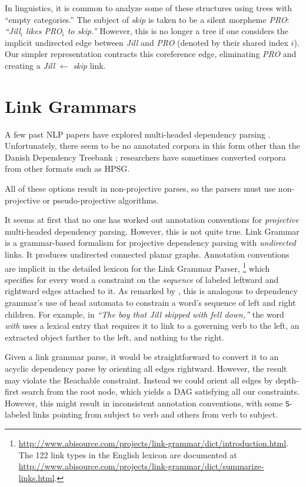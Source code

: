 \documentclass[11pt]{article}
\newcommand{\Note}[4][]{\todo[author=#2,color=#3,fancyline,#1]{#4}}
\newcommand{\noteJE}[2][]{\Note[#1]{JE}{green!40}{#2}}
\begin{document}
In linguistics, it is common to analyze some of these structures using trees with ``empty categories.''  The subject of {\em skip} is taken to be a silent morpheme {\em PRO}:
{\em ``Jill$_i$ likes PRO$_i$ to skip.''}  However, this is no longer a tree if one considers the implicit undirected edge between {\em Jill} and {\em PRO} (denoted by their shared index $i$).  Our simpler representation contracts this coreference edge, eliminating {\em PRO} and creating a {\em Jill} $\leftarrow$ {\em skip} link.  

\section{Link Grammars}

A few past NLP papers have explored multi-headed dependency parsing \cite{buchkromann-2006,mcdonald-pereira-2006,sagae-tsujii-2008,gomezrodriguez-nivre-2013}.  Unfortunately, there seem to be no annotated corpora in this form other than the Danish Dependency Treebank \cite{kromann-2003}; researchers have sometimes converted corpora from other formats such as HPSG.  

All of these options result in non-projective parses, so the parsers must use non-projective or pseudo-projective algorithms.

It seems at first that no one has worked out annotation conventions for {\em projective} multi-headed dependency parsing.  However, this is not quite true.  Link Grammar \cite{SleatorTemperly91} is a grammar-based formalism for projective dependency parsing with {\em undirected} links.  It produces undirected connected planar graphs.  Annotation conventions are implicit in the detailed lexicon for the Link Grammar Parser,\noteJE{check caps}%
\footnote{\url{http://www.abisource.com/projects/link-grammar/dict/introduction.html}.  The 122 link types in the English lexicon are documented at \url{http://www.abisource.com/projects/link-grammar/dict/summarize-links.html}.} 
which specifies for every word a constraint on the {\em sequence} of labeled leftward and rightward edges attached to it.  As remarked by , this is analogous to dependency grammar's use of head automata to constrain a word's sequence of left and right children.  For example, in {\em ``The boy that Jill skipped with fell down,''} the word {\em with} uses a lexical entry that requires it to link to a governing verb to the left, an extracted object farther to the left, and nothing to the right.

Given a link grammar parse, it would be straightforward to convert it to an acyclic dependency parse by orienting all edges rightward.  However, the result may violate the {\sc Reachable} constraint.  Instead we could orient all edges by depth-first search from the root node, which yields a DAG satisfying all our constraints.  However, this might result in inconsistent annotation conventions, with some \texttt{S}-labeled links pointing from subject to verb and others from verb to subject.  
\end{document}
